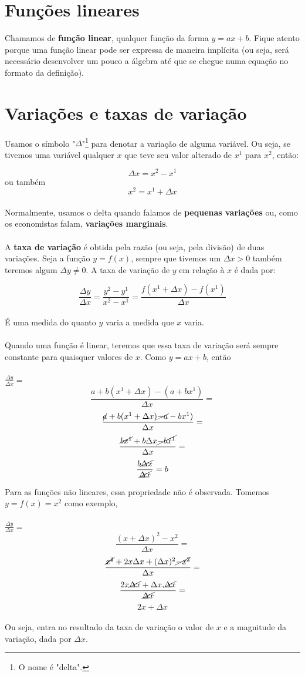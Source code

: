 \documentclass[a4paper,11pt,oneside]{book}
\theoremstyle{definition}
\theoremstyle{break}
\begin{document}
\section{Funções lineares}

Chamamos de \textbf{função linear}, qualquer função da forma $y = ax + b$. Fique atento porque uma função linear pode ser expressa de maneira implícita (ou seja, será necessário desenvolver um pouco a álgebra até que se chegue numa equação no formato da definição).

\section{Variações e taxas de variação}

Usamos o símbolo "$\Delta$"\footnote{O nome é "delta".} para denotar a variação de alguma variável. Ou seja, se tivemos uma variável qualquer $x$ que teve seu valor alterado de $x^1$ para $x^2$, então:

$$ \Delta x = x^2 - x^1 $$
ou também
$$ x^2 = x^1 + \Delta x $$
\\
Normalmente, usamos o delta quando falamos de \textbf{pequenas variações} ou, como os economistas falam, \textbf{variações marginais}.
\\
\\
A \textbf{taxa de variação} é obtida pela razão (ou seja, pela divisão) de duas variações. Seja a função $y = f(x)$, sempre que tivemos um $\Delta x > 0$ também teremos algum $\Delta y \neq 0$. A taxa de variação de $y$ em relação à $x$ é dada por:

$$ \frac{\Delta y}{\Delta x} = \frac{y^2 - y^1}{x^2 - x^1} = \frac{f(x^1 + \Delta x) - f(x^1)}{\Delta x} $$
\\
É uma medida do quanto $y$ varia a medida que $x$ varia.
\\
\\
Quando uma função é linear, teremos que essa taxa de variação será sempre constante para quaisquer valores de $x$. Como $y = ax + b$, então
\\
\\
\Large $ \frac{\Delta y}{\Delta x} = $ \normalsize
$$ \frac{a+b(x^1 + \Delta x) - (a + bx^1)}{\Delta x} = $$
$$ \frac{\cancel{a}+b(x^1 + \Delta x) \cancel{-a} - bx^1)}{\Delta x} = $$
$$ \frac{\cancel{bx^1} + b \Delta x \cancel{- bx^1}}{\Delta x} = $$
$$ \frac{b \cancel{\Delta x}}{\cancel{\Delta x}} = b  $$

Para as funções não lineares, essa propriedade não é observada. Tomemos $y = f(x) = x^2$ como exemplo,
\\
\\
\Large $ \frac{\Delta y}{\Delta x} = $ \normalsize
$$ \frac{(x + \Delta x)^2 - x^2}{\Delta x} = $$ 
$$  \frac{\cancel{x^2} + 2x \Delta x + (\Delta x)^2 \cancel{-x^2}}{\Delta x} = $$
$$  \frac{2x \cancel{\Delta x} + \Delta x . \cancel{\Delta x}}{\cancel{\Delta x}} = $$
$$  2x + \Delta x $$
\\
Ou seja, entra no resultado da taxa de variação o valor de $x$ e a magnitude da variação, dada por $\Delta x$.
\end{document}
